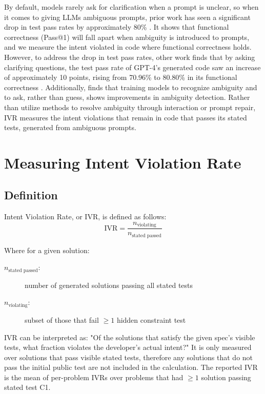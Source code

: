 \documentclass[11pt]{article}
\begin{document}
By default, models rarely ask for clarification when a prompt is unclear, so when it comes to giving LLMs ambiguous prompts, prior work has seen a significant drop in test pass rates by approximately 80\% \citep{li2026clareval}. It shows that functional correctness (Pass@1) will fall apart when ambiguity is introduced to prompts, and we measure the intent violated in code where functional correctness holds. However, to address the drop in test pass rates, other work finds that by asking clarifying questions, the test pass rate of GPT-4's generated code saw an increase of approximately 10 points, rising from 70.96\% to 80.80\% in its functional correctness \citep{mu2023clarifygpt}. Additionally, \citet{kim2024aligning} finds that training models to recognize ambiguity and to ask, rather than guess, shows improvements in ambiguity detection. Rather than utilize methods to resolve ambiguity through interaction or prompt repair, IVR measures the intent violations that remain in code that passes its stated tests, generated from ambiguous prompts. 

\section{Measuring Intent Violation Rate}

\subsection{Definition}
Intent Violation Rate, or IVR, is defined as follows: 
\begin{equation}
  \mathrm{IVR} = \frac{n_{\text{violating}}}{n_{\text{stated passed}}}
\end{equation}

Where for a given solution:
\begin{description}
  \item[$n_{\text{stated passed}}$:] number of generated solutions passing all stated tests
  \item[$n_{\text{violating}}$:] subset of those that fail $\geq 1$ hidden constraint test
\end{description}

IVR can be interpreted as: "Of the solutions that satisfy the given spec's visible tests, what fraction violates the developer's actual intent?" It is only measured over solutions that pass visible stated tests, therefore any solutions that do not pass the initial public test are not included in the calculation. The reported IVR is the mean of per-problem IVRs over problems that had $\geq 1$ solution passing stated test C1. 
\end{document}
